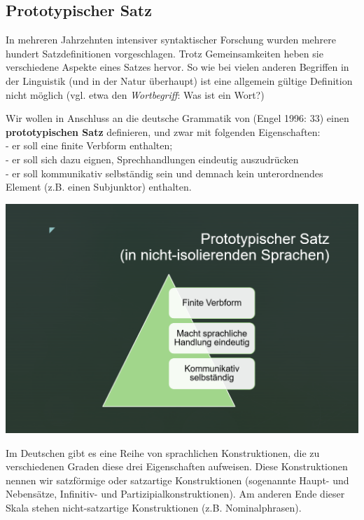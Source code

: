 \documentclass[
  letterpaper,
  DIV=11,
  numbers=noendperiod]{scrreprt}
\begin{document}
\hypertarget{prototypischer-satz}{%
\subsection{Prototypischer Satz}\label{prototypischer-satz}}

In mehreren Jahrzehnten intensiver syntaktischer Forschung wurden
mehrere hundert Satzdefinitionen vorgeschlagen. Trotz Gemeinsamkeiten
heben sie verschiedene Aspekte eines Satzes hervor. So wie bei vielen
anderen Begriffen in der Linguistik (und in der Natur überhaupt) ist
eine allgemein gültige Definition nicht möglich (vgl. etwa den
\emph{Wortbegriff}: Was ist ein Wort?)

Wir wollen in Anschluss an die deutsche Grammatik von (Engel 1996: 33)
einen \textbf{prototypischen Satz} definieren, und zwar mit folgenden
Eigenschaften:\\
- er soll eine finite Verbform enthalten;\\
- er soll sich dazu eignen, Sprechhandlungen eindeutig auszudrücken\\
- er soll kommunikativ selbständig sein und demnach kein unterordnendes
Element (z.B. einen Subjunktor) enthalten.

\includegraphics[width=1\textwidth,height=\textheight]{./pictures/satzdefinition.png}

Im Deutschen gibt es eine Reihe von sprachlichen Konstruktionen, die zu
verschiedenen Graden diese drei Eigenschaften aufweisen. Diese
Konstruktionen nennen wir satzförmige oder satzartige Konstruktionen
(sogenannte Haupt- und Nebensätze, Infinitiv- und
Partizipialkonstruktionen). Am anderen Ende dieser Skala stehen
nicht-satzartige Konstruktionen (z.B. Nominalphrasen).
\end{document}
